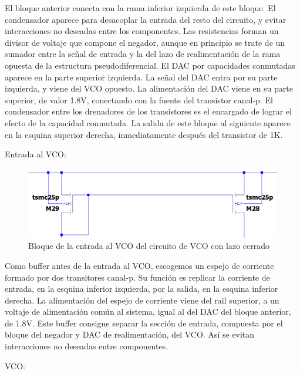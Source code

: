 \documentclass[12pt]{report} %
\begin{document}
	El bloque anterior conecta con la rama inferior izquierda de este bloque. El condensador aparece para desacoplar la entrada del resto del circuito, y evitar interacciones no deseadas entre los componentes. Las resistencias forman un divisor de voltaje que compone el negador, aunque en principio se trate de un sumador entre la señal de entrada y la del lazo de realimentación de la rama opuesta de la estructura pseudodiferencial. El DAC por capacidades conmutadas aparece en la parte superior izquierda. La señal del DAC entra por su parte izquierda, y viene del VCO opuesto. La alimentación del DAC viene en su parte superior, de valor 1.8V, conectando con la fuente del transistor canal-p. El condensador entre los drenadores de los transistores es el encargado de lograr el efecto de la capacidad conmutada. La salida de este bloque al siguiente aparece en la esquina superior derecha, inmediatamente después del transistor de 1K.
	
	Entrada al VCO:
	
	\begin{figure}[H]
		\includegraphics[width=\textwidth]{ltspice-vco-closed-current-mirror-block.png}
		\caption[Bloque de la entrada al VCO del circuito de VCO con lazo cerrado]{Bloque de la entrada al VCO del circuito de VCO con lazo cerrado}
		\label{fig:ltspice-vco-closed-current-mirror-block.png}
	\end{figure}

	Como buffer antes de la entrada al VCO, escogemos un espejo de corriente formado por dos transitores canal-p. Su función es replicar la corriente de entrada, en la esquina inferior izquierda, por la salida, en la esquina inferior derecha. La alimentación del espejo de corriente viene del rail superior, a un voltaje de alimentación común al sistema, igual al del DAC del bloque anterior, de 1.8V. Este buffer consigue separar la sección de entrada, compuesta por el bloque del negador y DAC de realimentación, del VCO. Así se evitan interacciones no deseadas entre componentes. %

	VCO:
		
\end{document}
